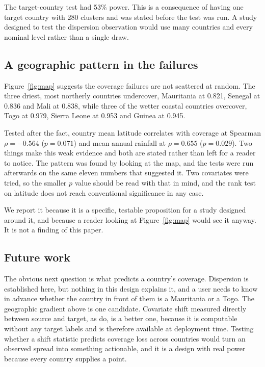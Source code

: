 \documentclass[11pt]{article}
\begin{document}
The target-country test had 53\% power. This is a consequence of having one
target country with 280 clusters and was stated before the test was run. A study
designed to test the dispersion observation would use many countries and every
nominal level rather than a single draw.

\subsection{A geographic pattern in the failures}

Figure~\ref{fig:map} suggests the coverage failures are not scattered at
random. The three driest, most northerly countries undercover, Mauritania at
0.821, Senegal at 0.836 and Mali at 0.838, while three of the wetter coastal
countries overcover, Togo at 0.979, Sierra Leone at 0.953 and Guinea at 0.945.

Tested after the fact, country mean latitude correlates with coverage at
Spearman $\rho = -0.564$ ($p = 0.071$) and mean annual rainfall at
$\rho = 0.655$ ($p = 0.029$). Two things make this weak evidence and both are
stated rather than left for a reader to notice. The pattern was found by
looking at the map, and the tests were run afterwards on the same eleven
numbers that suggested it. Two covariates were tried, so the smaller $p$ value
should be read with that in mind, and the rank test on latitude does not reach
conventional significance in any case.

We report it because it is a specific, testable proposition for a study
designed around it, and because a reader looking at Figure~\ref{fig:map} would
see it anyway. It is not a finding of this paper.

\subsection{Future work}

The obvious next question is what predicts a country's coverage. Dispersion is
established here, but nothing in this design explains it, and a user needs to
know in advance whether the country in front of them is a Mauritania or a Togo.
The geographic gradient above is one candidate. Covariate shift measured
directly between source and target, as \citet{adjei2026} do, is a better one,
because it is computable without any target labels and is therefore available at
deployment time. Testing whether a shift statistic predicts coverage loss across
countries would turn an observed spread into something actionable, and it is a
design with real power because every country supplies a point.
\end{document}
